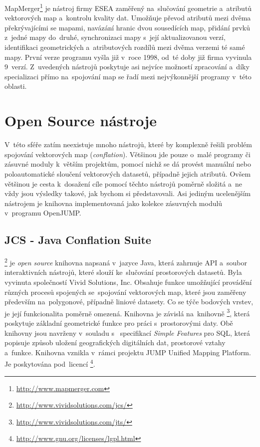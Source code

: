 MapMerger\footnote{\url{http://www.mapmerger.com}} je  nástroj firmy 
ESEA zaměřený na~slučování geometrie a~atributů vektorových map a~kontrolu 
kvality dat. Umožňuje převod atributů mezi dvěma překrývajícími se mapami, 
navázání hranic dvou sousedících map, přidání prvků z~jedné mapy do~druhé, 
synchronizaci mapy s~její aktualizovanou verzí, identifikaci geometrických 
a~atributových rozdílů mezi dvěma verzemi té samé mapy. První verze programu 
vyšla již v~roce 1998, od~té doby již firma vyvinula 9~verzí. Z~uvedených 
nástrojů poskytuje asi nejvíce možností zpracování a~díky specializaci 
přímo na~spojování map se řadí mezi nejvýkonnější programy v~této oblasti. 


\section{Open Source nástroje}
\label{open-source}

V~této sféře zatím neexistuje mnoho nástrojů, které by komplexně řešili problém
spojování vektorových map (\textit{conflation}). Většinou jde pouze o~malé 
programy či zásuvné moduly k~větším projektům, pomocí nichž se dá provést manuální
nebo poloautomatické sloučení vektorových datasetů, případně jejich atributů. 
Ovšem většinou je cesta k~dosažení cíle pomocí těchto nástrojů poměrně složitá 
a~ne vždy jsou výsledky takové, jak bychom si představovali. Asi jediným 
ucelenějším nástrojem je knihovna  implementovaná jako kolekce 
zásuvných modulů v~programu OpenJUMP.


\subsection{JCS - Java Conflation Suite}
\label{jcs}

\footnote{\url{http://www.vividsolutions.com/jcs/}} je \textit{open source}
knihovna napsaná v~jazyce Java, která zahrnuje API a~soubor interaktivních nástrojů, 
které slouží ke~slučování prostorových datasetů. Byla vyvinuta společností Vivid 
Solutions, Inc. Obsahuje funkce umožňující provádění různých procesů spojených 
se~spojování vektorových map, které jsou zaměřeny především na~polygonové, případně 
liniové datasety. Co se týče bodových vrstev, je její funkcionalita poměrně omezená. 
Knihovna  je závislá na~knihovně 
\footnote{\url{http://www.vividsolutions.com/jts/}}, která poskytuje 
základní geometrické funkce pro práci s~prostorovými daty. Obě knihovny jsou navrženy 
v~souladu s~ specifikací \textit{Simple Features} pro SQL,
která popisuje způsob uložení geografic\-kých digitálních dat, pro\-storové vztahy 
a~funkce. Knihovna  vznikla v~rámci projektu JUMP Unified Mapping Platform. Je 
poskytována pod~licencí 
\footnote{\url{http://www.gnu.org/licenses/lgpl.html}}.


